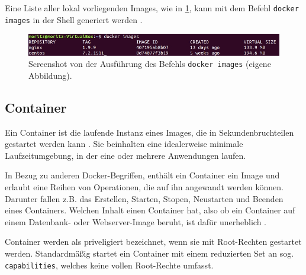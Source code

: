 \documentclass[../main.tex]{subfiles}
\begin{document}
			Eine Liste aller lokal vorliegenden Images, wie in \fig \ref{fig:intro_dockerImages}, kann mit dem Befehl \texttt{docker images} in der Shell generiert werden \cite{dockerImages}.

			\begin{figure}[!htbp]
          \centering
          \includegraphics[width=1.0\textwidth]{./images/intro_dockerImages.jpg}
          \caption{Screenshot von der Ausführung des Befehls \texttt{docker images} (eigene Abbildung).}
          \label{fig:intro_dockerImages}
      \end{figure}


    \subsection{Container}
		\label{dockerContainer}
			Ein Container ist die laufende Instanz eines Images, die in Sekundenbruchteilen gestartet werden kann \cite[S.1]{dockerIntroIEEE}. Sie beinhalten eine idealerweise minimale Laufzeitumgebung, in der eine oder mehrere Anwendungen laufen.

      In Bezug zu anderen Docker-Begriffen, enthält ein Container ein Image und erlaubt eine Reihen von Operationen, die auf ihn angewandt werden können. Darunter fallen z.B. das Erstellen, Starten, Stopen, Neustarten und Beenden eines Containers. Welchen Inhalt einen Container hat, also ob ein Container auf einem Datenbank- oder Webserver-Image beruht, ist dafür unerheblich \cite[S.12]{dockerBook}\cite[S.2]{dockerLXCKub}.

      Container werden als priveligiert bezeichnet, wenn sie mit Root-Rechten gestartet werden. Standardmäßig startet ein Container mit einem reduzierten Set an sog. \texttt{capabilities}, welches keine vollen Root-Rechte umfasst.


\end{document}
